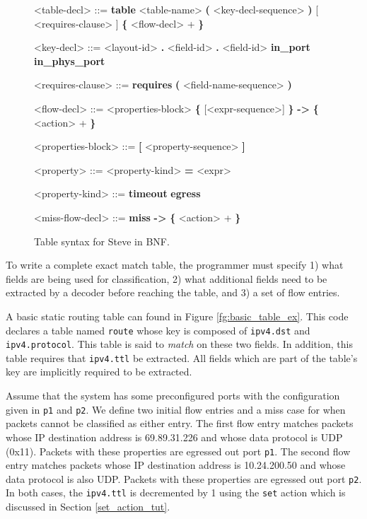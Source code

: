 \begin{figure}
\begin{mdframed}
\begin{grammar}
<table-decl> ::=
\textbf{table} <table-name> \textbf{(} <key-decl-sequence> \textbf{)} 
[ <requires-clause> ]
\textbf{\{} 
<flow-decl> + 
\textbf{\}}

<key-decl> ::=
<layout-id> \textbf{.} <field-id>
 \textbf{.} <field-id>
\alt \textbf{in\_port}
\alt \textbf{in\_phys\_port}

<requires-clause> ::=
\textbf{requires} \textbf{(} <field-name-sequence> \textbf{)}

<flow-decl> ::=
<properties-block>
\textbf{\{} [<expr-sequence>] \textbf{\}} \textbf{-\textgreater}
\textbf{\{} 
<action> +
\textbf{\}}

<properties-block> ::=
\textbf{[} <property-sequence> \textbf{]}

<property> ::=
<property-kind> \textbf{=} <expr>

<property-kind> ::=
\textbf{timeout}
\alt \textbf{egress}

<miss-flow-decl> ::=
\textbf{miss} \textbf{-\textgreater}
\textbf{\{} 
<action> +
\textbf{\}}
\end{grammar}
\end{mdframed}
\caption{Table syntax for Steve in BNF.}
\label{fg:table_syntax}
\end{figure}

To write a complete exact match table, the programmer must specify 1) what fields are being used for classification, 2) what additional fields need to be extracted by a decoder before reaching the table, and 3) a set of flow entries. 

A basic static routing table can found in Figure \ref{fg:basic_table_ex}. This code declares a table named \texttt{route} whose key is composed of \texttt{ipv4.dst} and \texttt{ipv4.protocol}. This table is said to \textit{match} on these two fields. In addition, this table requires that \texttt{ipv4.ttl} be extracted. All fields which are part of the table's key are implicitly required to be extracted.

Assume that the system has some preconfigured ports with the configuration given in \texttt{p1} and \texttt{p2}. We define two initial flow entries and a miss case for when packets cannot be classified as either entry. The first flow entry matches packets whose IP destination address is 69.89.31.226 and whose data protocol is UDP (0x11). Packets with these properties are egressed out port \texttt{p1}. The second flow entry matches packets whose IP destination address is 10.24.200.50 and whose data protocol is also UDP. Packets with these properties are egressed out port \texttt{p2}. In both cases, the \texttt{ipv4.ttl} is decremented by 1 using the \texttt{set} action which is discussed in Section \ref{set_action_tut}.

